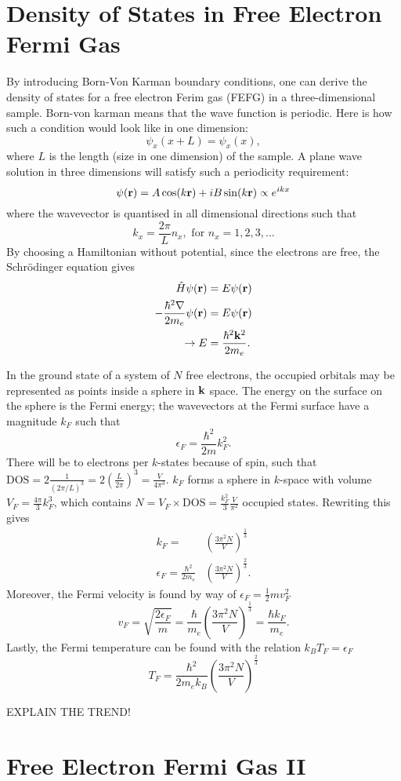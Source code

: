 \documentclass[11pt]{amsart}
\begin{document}
\section{Density of States in Free Electron Fermi Gas}
By introducing Born-Von Karman boundary conditions, one can derive the density of states for a free electron Ferim gas (FEFG) in a three-dimensional sample. Born-von karman means that the wave function is periodic. Here is how such a condition would look like in one dimension:
\begin{equation}
\psi_x(x + L) = \psi_x(x),
\end{equation}
where $L$ is the length (size in one dimension) of the sample. A plane wave solution in three dimensions will satisfy such a periodicity requirement:
\begin{equation}
\psi(\vb{r}) = A\cos(k\vb{r}) + iB\sin(k\vb{r}) \propto e^{ikx}
\end{equation}
where the wavevector is quantised in all dimensional directions such that
\begin{equation*}
k_x = \frac{2\pi}{L}n_x, \text{ for } n_x = 1, 2, 3, \dots
\end{equation*}
By choosing a Hamiltonian without potential, since the electrons are free, the Schrödinger equation gives
\begin{align*}
\hat{H}\psi(\vb{r}) &= E\psi(\vb{r}) \\
-\frac{\hbar^2\nabla}{2m_e}\psi(\vb{r}) &= E\psi(\vb{r}) \\
\rightarrow E &= \frac{\hbar^2 \vb{k}^2}{2m_e}.
\end{align*}

In the ground state of a system of $N$ free electrons, the occupied orbitals may be represented as points inside a sphere in $\vb{k}$ space. The energy on the surface on the sphere is the Fermi energy; the wavevectors at the Fermi surface have a magnitude $k_F$ such that
\begin{equation}
\epsilon_F = \frac{\hbar^2}{2m}k_F^2.
\end{equation}
There will be to electrons per $k$-states because of spin, such that $\text{DOS} = 2\frac{1}{(2\pi/L)^3} = 2\left(\frac{L}{2\pi} \right)^3 = \frac{V}{4\pi^3}$. $k_F$  forms a sphere in $k$-space with volume $V_F = \frac{4\pi}{3}k_F^3$, which contains $N = V_F \times \text{DOS} = \frac{k_F^2}{3}\frac{V}{\pi^2}$ occupied states. Rewriting this gives
\begin{align}
k_F = &\left(\frac{3\pi^2N}{V} \right)^{\frac{1}{3}} \\
\epsilon_F =\frac{\hbar^2}{2m_e} &\left(\frac{3\pi^2N}{V} \right)^{\frac{2}{3}}.
\end{align}
Moreover, the Fermi velocity is found by way of $\epsilon_F = \frac{1}{2}mv_F^2$
\begin{equation}
v_F = \sqrt{\frac{2\epsilon_F}{m}} = \frac{\hbar}{m_e}\left(\frac{3\pi^2 N}{V} \right)^{\frac{1}{3}} = \frac{\hbar k_F}{m_e}.
\end{equation}
Lastly, the Fermi temperature can be found with the relation $k_BT_F = \epsilon_F$
\begin{equation}
T_F = \frac{\hbar^2}{2m_ek_B}\left(\frac{3\pi^2 N}{V} \right)^{\frac{2}{3}}
\end{equation}

EXPLAIN THE TREND!

\section{Free Electron Fermi Gas II}
\end{document}
